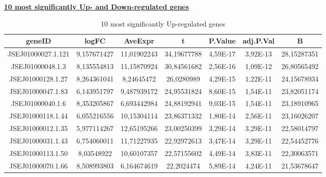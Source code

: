 \documentclass[12pt, a4paper]{report}
\begin{document}
\underline{\textbf{10 most significantly Up- and Down-regulated genes}} 
\begin{table}[H]
	\centering
	\scriptsize
	\begin{tabular}{c|c|c|c|c|c|c}
		\textbf{geneID}& \textbf{logFC}&\textbf{AveExpr}&\textbf{t}&\textbf{P.Value}&\textbf{adj.P.Val}& \textbf{B}\\
		\hline
JSEJ01000027.1.121	&9,157671427&	11,01902243&	34,19677788&	4,59E-17&	3,92E-13&	28,15287351\\
JSEJ01000048.1.3&	8,135554813	&11,15870924&	30,84561682&	2,56E-16&	1,09E-12&	26,80565492\\
JSEJ01000128.1.27&	8,264361041&	8,24645472&	26,0280989&	4,29E-15&	1,22E-11&	24,15678934\\
JSEJ01000047.1.83&	6,143951797&	9,487939172&	24,95531824&	8,60E-15&	1,54E-11&	23,82051174\\
JSEJ01000040.1.6&	8,353205867&	6,693442984&	24,88192941&	9,03E-15&	1,54E-11&	23,18910965\\
JSEJ01000118.1.44&	6,055216556&	10,15304114&	23,86371332&	1,80E-14&	2,56E-11&	23,16026207\\
JSEJ01000012.1.35&	5,977114267&	12,65195266&	23,00250399&	3,29E-14&	3,29E-11&	22,58014797\\
JSEJ01000031.1.43&	6,754060011&	11,71227935&	22,92972613&	3,47E-14&	3,29E-11&	22,54452776\\
JSEJ01000113.1.50&	8,03548922&	10,60107357&	22,57155602&	4,49E-14&	3,83E-11&	22,30063571\\
JSEJ01000070.1.66&	8,508993803&	6,164674619&	22,2024474&	5,89E-14&	4,24E-11&	21,53678647\\
		\hline
		\end{tabular}
	\caption{10 most significantly Up-regulated genes}
\end{table}
\end{document}
